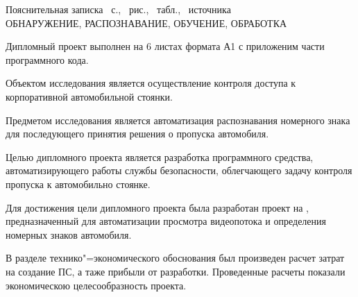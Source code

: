 \thispagestyle{empty}

Пояснительная записка \pageref*{LastPage}~с., \totfig{}~рис., \tottab{}~табл., \totref{}~источника \\
ОБНАРУЖЕНИЕ, РАСПОЗНАВАНИЕ, ОБУЧЕНИЕ, ОБРАБОТКА

\vspace{4\parsep}

Дипломный проект выполнен на 6 листах формата А1 с приложеним части программного кода. 

Объектом исследования является осуществление контроля доступа к корпоративной автомобильной стоянки.

Предметом исследования является автоматизация распознавания номерного знака для последующего принятия решения о пропуска автомобиля.

Целью дипломного проекта является разработка программного средства, автоматизирующего работы службы безопасности, облегчающего задачу контроля пропуска к автомобильно стоянке.

Для достижения цели дипломного проекта была разработан проект на \dotnet{}, предназначенный для автоматизации просмотра видеопотока и определения номерных знаков автомобиля.

В разделе технико"=экономического обоснования был произведен расчет затрат на создание ПС, а таже прибыли от разработки. Проведенные расчеты показали экономическою целесообразность проекта.


\clearpage
